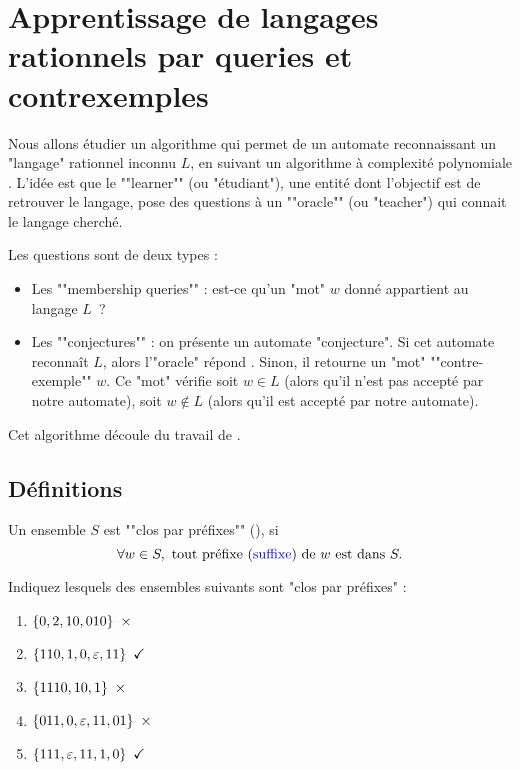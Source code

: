 \section{Apprentissage de langages rationnels par queries et contrexemples}

Nous allons étudier un algorithme qui permet de  un automate reconnaissant un "langage" rationnel inconnu $L$,
en suivant un algorithme à complexité polynomiale .
L'idée est que le ""learner"" (ou "étudiant"), une entité dont l'objectif est de retrouver le langage, pose des
questions à un ""oracle"" (ou "teacher") qui connait le langage cherché.

Les questions sont de deux types :
\begin{itemize}
	\item Les ""membership queries"" : est-ce qu'un "mot" $w$ donné appartient au langage $L$ ?
	\item Les ""conjectures"" : on présente un automate "conjecture". Si cet automate reconnaît $L$, alors
	      l'"oracle" répond .
	      Sinon, il retourne un "mot" ""contre-exemple"" $w$. Ce "mot" vérifie soit $w \in L$ (alors qu'il
	      n’est pas accepté par notre automate), soit $w \notin L$ (alors qu'il est accepté par notre automate).
\end{itemize}

Cet algorithme découle du travail de \cite{angluinLearning}.


\subsection{Définitions}


\begin{definition}
	Un ensemble $S$ est ""clos par préfixes"" (), si
	$$\forall w \in S, \text{ tout préfixe (\textcolor{blue}{suffixe}) de $w$ est dans } S.$$
\end{definition}

\begin{exercice}
	Indiquez lesquels des ensembles suivants sont "clos par préfixes" :
	\begin{enumerate}
		\item $\set{0,2,10,010} \ \times$
		\item $\set{110,1,0,\motvide,11} \ \checkmark$
		\item $\set{1110,10,1} \ \times$
		\item $\set{011,0,\motvide,11,01} \ \times$
		\item $\set{111,\motvide,11,1,0} \ \checkmark$
	\end{enumerate}
\end{exercice}

